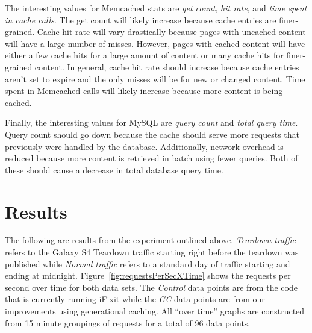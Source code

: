 \documentclass[12pt]{ucthesis}
\begin{document}
The interesting values for \textsf{Memcached} stats are \textit{get count}, \textit{hit rate}, and \textit{time spent in cache calls}.
The get count will likely increase because cache entries are finer-grained.
Cache hit rate will vary drastically because pages with uncached content will have a large number of misses.
However, pages with cached content will have either a few cache hits for a large amount of content or many cache hits for finer-grained content.
In general, cache hit rate should increase because cache entries aren't set to expire and the only misses will be for new or changed content.
Time spent in \textsf{Memcached} calls will likely increase because more content is being cached.

Finally, the interesting values for \textsf{MySQL} are \textit{query count} and \textit{total query time}.
Query count should go down because the cache should serve more requests that previously were handled by the database.
Additionally, network overhead is reduced because more content is retrieved in batch using fewer queries.
Both of these should cause a decrease in total database query time.


\section{Results} \label{results}
The following are results from the experiment outlined above.
\textit{Teardown traffic} refers to the Galaxy S4 Teardown traffic starting right before the teardown was published while \textit{Normal traffic} refers to a standard day of traffic starting and ending at midnight.
Figure~\ref{fig:requestsPerSecXTime} shows the requests per second over time for both data sets.
The \textit{Control} data points are from the code that is currently running \textsf{iFixit} while the \textit{GC} data points are from our improvements using generational caching.
All ``over time'' graphs are constructed from 15 minute groupings of requests for a total of 96 data points.
\end{document}
